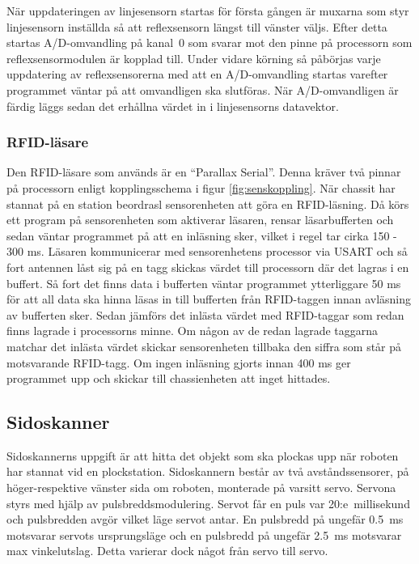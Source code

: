 När uppdateringen av linjesensorn startas för första gången är muxarna som styr linjesensorn inställda så att reflexsensorn längst till vänster väljs. Efter detta startas A/D-omvandling på kanal~0 som svarar mot den pinne på processorn som reflexsensormodulen är kopplad till. Under vidare körning så påbörjas varje uppdatering av reflexsensorerna med att en A/D-omvandling startas varefter programmet väntar på att omvandligen ska slutföras. När A/D-omvandligen är färdig läggs sedan det erhållna värdet in i linjesensorns datavektor.


\subsubsection{RFID-läsare}
Den RFID-läsare som används är en “Parallax Serial”. Denna kräver två pinnar på processorn enligt kopplingsschema i figur \ref{fig:senskoppling}. När chassit har stannat på en station beordrasl sensorenheten att göra en RFID-läsning. Då körs ett program på sensorenheten som aktiverar läsaren, rensar läsarbufferten och sedan väntar programmet på att en inläsning sker, vilket i regel tar cirka 150 - 300 ms. Läsaren kommunicerar med sensorenhetens processor via USART och så fort antennen låst sig på en tagg skickas värdet till processorn där det lagras i en buffert. Så fort det finns data i bufferten väntar programmet ytterliggare 50 ms för att all data ska hinna läsas in till bufferten från RFID-taggen innan avläsning av bufferten sker. Sedan jämförs det inlästa värdet med RFID-taggar som redan finns lagrade i processorns minne. Om någon av de redan lagrade taggarna matchar det inlästa värdet skickar sensorenheten tillbaka den siffra som står på motsvarande RFID-tagg. Om ingen inläsning gjorts innan 400 ms ger programmet upp och skickar till chassienheten att inget hittades.

\subsection{Sidoskanner}
Sidoskannerns uppgift är att hitta det objekt som ska plockas upp när roboten har stannat vid en plockstation. Sidoskannern består av två avståndssensorer, på höger-respektive vänster sida om roboten, monterade på varsitt servo. Servona styrs med hjälp av pulsbreddsmodulering. Servot får en puls var 20:e~millisekund och pulsbredden avgör vilket läge servot antar. En pulsbredd på ungefär 0.5~ms motsvarar servots ursprungsläge och en pulsbredd på ungefär 2.5~ms motsvarar max vinkelutslag. Detta varierar dock något från servo till servo.

